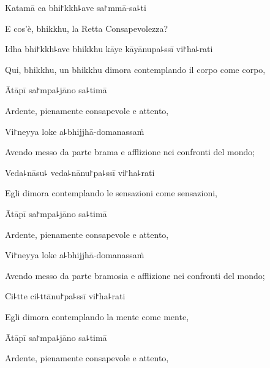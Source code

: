 Katamā ca bhi꜓kkh꜕ave sa꜓mmā-sa꜕ti

\begin{english}
  E cos'è, bhikkhu, la Retta Consapevolezza?
\end{english}

Idha bhi꜓kkh꜕ave bhikkhu kāye kāyānupa꜕ssī vi꜓ha꜕rati

\begin{english}
  Qui, bhikkhu, un bhikkhu dimora contemplando il corpo come corpo,
\end{english}

Ātāpī sa꜓mpa꜕jāno sa꜕timā

\begin{english}
  Ardente, pienamente consapevole e attento,
\end{english}

Vi꜓neyya loke a꜕bhijjhā-domanassaṁ

\begin{english}
  Avendo messo da parte brama e afflizione nei confronti del mondo;
\end{english}

Veda꜕nāsu꜕ veda꜕nānu꜓pa꜕ssī vi꜓ha꜕rati

\begin{english}
  Egli dimora contemplando le sensazioni come sensazioni,
\end{english}

\ifaivedition
\clearpage
\fi

Ātāpī sa꜓mpa꜕jāno sa꜕timā

\begin{english}
  Ardente, pienamente consapevole e attento,
\end{english}

Vi꜓neyya loke a꜕bhijjhā-domanassaṁ

\begin{english}
  Avendo messo da parte bramosia e afflizione nei confronti del mondo;
\end{english}

Ci꜕tte ci꜕ttānu꜓pa꜕ssī vi꜓ha꜕rati

\begin{english}
  Egli dimora contemplando la mente come mente,
\end{english}

Ātāpī sa꜓mpa꜕jāno sa꜕timā

\begin{english}
  Ardente, pienamente consapevole e attento,
\end{english}

